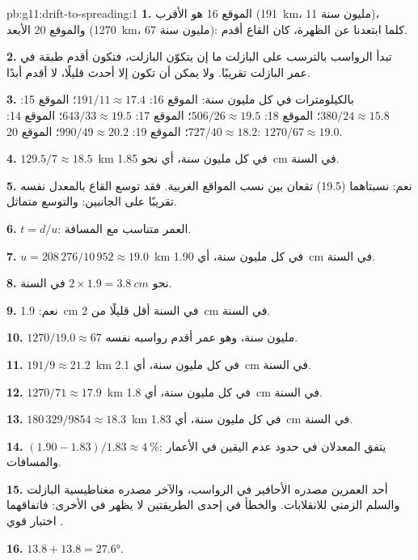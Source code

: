 \begin{solution}{pb:g11:drift-to-spreading:1}
\textbf{1.} الموقع 16 هو الأقرب (\qty{191}{km}، 11 مليون سنة)، والموقع 20
الأبعد (\qty{1270}{km}، 67 مليون سنة): كلما ابتعدنا عن الظهرة،
كان القاع أقدم.

\textbf{2.} تبدأ الرواسب بالترسب على البازلت ما إن يتكوّن
البازلت، فتكون أقدم طبقة في عمر البازلت تقريبًا. ولا يمكن أن تكون إلا
أحدث قليلًا، لا أقدم أبدًا.

\textbf{3.} بالكيلومترات في كل مليون سنة: الموقع 16: $191/11 \approx 17.4$؛
الموقع 15: $380/24 \approx 15.8$؛ الموقع 18: $506/26 \approx 19.5$؛ الموقع 17:
$643/33 \approx 19.5$؛ الموقع 14: $727/40 \approx 18.2$؛ الموقع 19: $990/49
\approx 20.2$؛ الموقع 20: $1270/67 \approx 19.0$.

\textbf{4.} $129.5/7 \approx \num{18.5}$~\unit{km} في كل مليون سنة، أي نحو
\qty{1.85}{cm} في السنة.

\textbf{5.} نعم: نسبتاهما (19.5) تقعان بين نسب المواقع الغربية.
فقد توسع القاع بالمعدل نفسه تقريبًا على الجانبين: والتوسع
متماثل.

\textbf{6.} $t = d/u$: العمر متناسب مع المسافة.

\textbf{7.} $u = 208\,276/10\,952 \approx \num{19.0}$~\unit{km} في كل مليون سنة،
أي \qty{1.90}{cm} في السنة.

\textbf{8.} نحو $2 \times 1.9 = \qty{3.8}{cm}$ في السنة.

\textbf{9.} نعم: \qty{1.9}{cm} في السنة أقل قليلًا من \qty{2}{cm} في
السنة.

\textbf{10.} $1270/19.0 \approx 67$ مليون سنة، وهو عمر أقدم
رواسبه نفسه.

\textbf{11.} $191/9 \approx \num{21.2}$~\unit{km} في كل مليون سنة، أي
\qty{2.1}{cm} في السنة.

\textbf{12.} $1270/71 \approx \num{17.9}$~\unit{km} في كل مليون سنة، أي
\qty{1.8}{cm} في السنة.

\textbf{13.} $180\,329/9854 \approx \num{18.3}$~\unit{km} في كل مليون سنة، أي
\qty{1.83}{cm} في السنة.

\textbf{14.} $(1.90 - 1.83)/1.83 \approx \qty{4}{\percent}$: يتفق المعدلان
في حدود عدم اليقين في الأعمار والمسافات.

\textbf{15.} أحد العمرين مصدره الأحافير في الرواسب، والآخر مصدره
مغناطيسية البازلت والسلم الزمني للانقلابات. والخطأ في إحدى
الطريقتين لا يظهر في الأخرى: فاتفاقهما اختبار قوي
.

\textbf{16.} $13.8 + 13.8 = \ang{27.6}$.


\end{solution}
